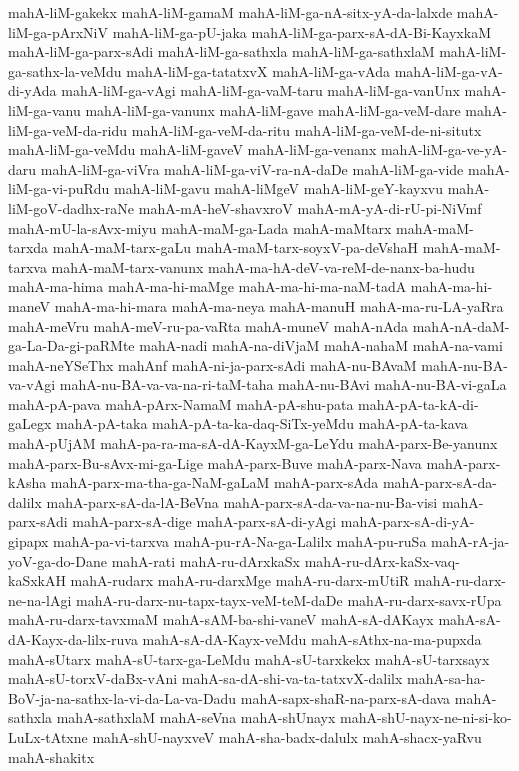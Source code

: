 {mahA-liM-gakekx
mahA-liM-gamaM
mahA-liM-ga-nA-sitx-yA-da-lalxde
mahA-liM-ga-pArxNiV
mahA-liM-ga-pU-jaka
mahA-liM-ga-parx-sA-dA-Bi-KayxkaM
mahA-liM-ga-parx-sAdi
mahA-liM-ga-sathxla
mahA-liM-ga-sathxlaM
mahA-liM-ga-sathx-la-veMdu
mahA-liM-ga-tatatxvX
mahA-liM-ga-vAda
mahA-liM-ga-vA-di-yAda
mahA-liM-ga-vAgi
mahA-liM-ga-vaM-taru
mahA-liM-ga-vanUnx
mahA-liM-ga-vanu
mahA-liM-ga-vanunx
mahA-liM-gave
mahA-liM-ga-veM-dare
mahA-liM-ga-veM-da-ridu
mahA-liM-ga-veM-da-ritu
mahA-liM-ga-veM-de-ni-situtx
mahA-liM-ga-veMdu
mahA-liM-gaveV
mahA-liM-ga-venanx
mahA-liM-ga-ve-yA-daru
mahA-liM-ga-viVra
mahA-liM-ga-viV-ra-nA-daDe
mahA-liM-ga-vide
mahA-liM-ga-vi-puRdu
mahA-liM-gavu
mahA-liMgeV
mahA-liM-geY-kayxvu
mahA-liM-goV-dadhx-raNe
mahA-mA-heV-shavxroV
mahA-mA-yA-di-rU-pi-NiVmf
mahA-mU-la-sAvx-miyu
mahA-maM-ga-Lada
mahA-maMtarx
mahA-maM-tarxda
mahA-maM-tarx-gaLu
mahA-maM-tarx-soyxV-pa-deVshaH
mahA-maM-tarxva
mahA-maM-tarx-vanunx
mahA-ma-hA-deV-va-reM-de-nanx-ba-hudu
mahA-ma-hima
mahA-ma-hi-maMge
mahA-ma-hi-ma-naM-tadA
mahA-ma-hi-maneV
mahA-ma-hi-mara
mahA-ma-neya
mahA-manuH
mahA-ma-ru-LA-yaRra
mahA-meVru
mahA-meV-ru-pa-vaRta
mahA-muneV
mahA-nAda
mahA-nA-daM-ga-La-Da-gi-paRMte
mahA-nadi
mahA-na-diVjaM
mahA-nahaM
mahA-na-vami
mahA-neYSeThx
mahAnf
mahA-ni-ja-parx-sAdi
mahA-nu-BAvaM
mahA-nu-BA-va-vAgi
mahA-nu-BA-va-va-na-ri-taM-taha
mahA-nu-BAvi
mahA-nu-BA-vi-gaLa
mahA-pA-pava
mahA-pArx-NamaM
mahA-pA-shu-pata
mahA-pA-ta-kA-di-gaLegx
mahA-pA-taka
mahA-pA-ta-ka-daq-SiTx-yeMdu
mahA-pA-ta-kava
mahA-pUjAM
mahA-pa-ra-ma-sA-dA-KayxM-ga-LeYdu
mahA-parx-Be-yanunx
mahA-parx-Bu-sAvx-mi-ga-Lige
mahA-parx-Buve
mahA-parx-Nava
mahA-parx-kAsha
mahA-parx-ma-tha-ga-NaM-gaLaM
mahA-parx-sAda
mahA-parx-sA-da-dalilx
mahA-parx-sA-da-lA-BeVna
mahA-parx-sA-da-va-na-nu-Ba-visi
mahA-parx-sAdi
mahA-parx-sA-dige
mahA-parx-sA-di-yAgi
mahA-parx-sA-di-yA-gipapx
mahA-pa-vi-tarxva
mahA-pu-rA-Na-ga-Lalilx
mahA-pu-ruSa
mahA-rA-ja-yoV-ga-do-Dane
mahA-rati
mahA-ru-dArxkaSx
mahA-ru-dArx-kaSx-vaq-kaSxkAH
mahA-rudarx
mahA-ru-darxMge
mahA-ru-darx-mUtiR
mahA-ru-darx-ne-na-lAgi
mahA-ru-darx-nu-tapx-tayx-veM-teM-daDe
mahA-ru-darx-savx-rUpa
mahA-ru-darx-tavxmaM
mahA-sAM-ba-shi-vaneV
mahA-sA-dAKayx
mahA-sA-dA-Kayx-da-lilx-ruva
mahA-sA-dA-Kayx-veMdu
mahA-sAthx-na-ma-pupxda
mahA-sUtarx
mahA-sU-tarx-ga-LeMdu
mahA-sU-tarxkekx
mahA-sU-tarxsayx
mahA-sU-torxV-daBx-vAni
mahA-sa-dA-shi-va-ta-tatxvX-dalilx
mahA-sa-ha-BoV-ja-na-sathx-la-vi-da-La-va-Dadu
mahA-sapx-shaR-na-parx-sA-dava
mahA-sathxla
mahA-sathxlaM
mahA-seVna
mahA-shUnayx
mahA-shU-nayx-ne-ni-si-ko-LuLx-tAtxne
mahA-shU-nayxveV
mahA-sha-badx-dalulx
mahA-shacx-yaRvu
mahA-shakitx
}
